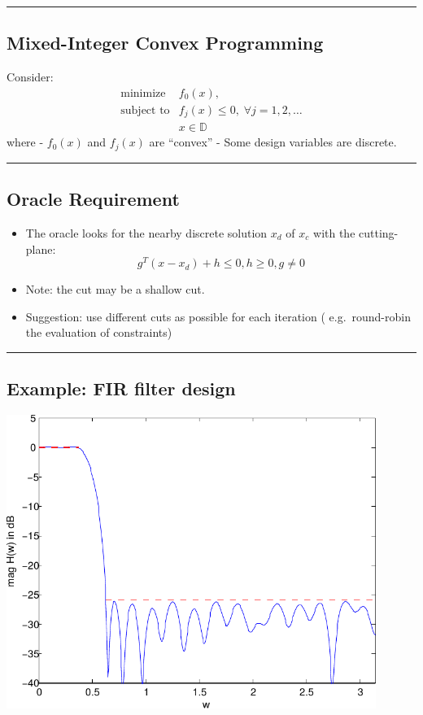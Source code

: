\documentclass[]{article}
\begin{document}
\begin{center}\rule{0.5\linewidth}{\linethickness}\end{center}

\hypertarget{mixed-integer-convex-programming}{%
\subsection{Mixed-Integer Convex
Programming}\label{mixed-integer-convex-programming}}

Consider: \[\begin{array}{ll}
        \text{minimize}      & f_0(x), \\
        \text{subject to}    & f_j(x) \leq 0, \; \forall j=1,2,\ldots \\
                             & x \in \mathbb{D} 
\end{array}\] where - \(f_0(x)\) and \(f_j(x)\) are ``convex'' - Some
design variables are discrete.

\begin{center}\rule{0.5\linewidth}{\linethickness}\end{center}

\hypertarget{oracle-requirement}{%
\subsection{Oracle Requirement}\label{oracle-requirement}}

\begin{itemize}
\item
  The oracle looks for the nearby discrete solution \(x_d\) of \(x_c\)
  with the cutting-plane:
  \[g^T (x - x_d) + h \leq 0, h \geq 0, g \neq 0\]
\item
  Note: the cut may be a shallow cut.
\item
  Suggestion: use different cuts as possible for each iteration (
  e.g.~round-robin the evaluation of constraints)
\end{itemize}

\begin{center}\rule{0.5\linewidth}{\linethickness}\end{center}

\hypertarget{example-fir-filter-design-1}{%
\subsection{Example: FIR filter
design}\label{example-fir-filter-design-1}}

\includegraphics[width=0.9\textwidth,height=\textheight]{ellipsoid.files/lowpass_ripple.pdf}
\end{document}
